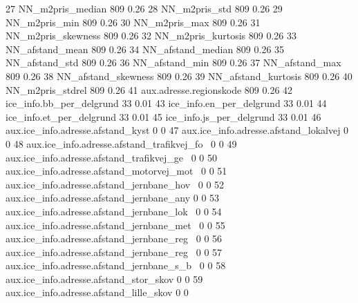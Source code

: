 \documentclass{report}
\begin{document}
\begin{Schunk}
\begin{Soutput}
 27 NN_m2pris_median                                       809              0.26
 28 NN_m2pris_std                                          809              0.26
 29 NN_m2pris_min                                          809              0.26
 30 NN_m2pris_max                                          809              0.26
 31 NN_m2pris_skewness                                     809              0.26
 32 NN_m2pris_kurtosis                                     809              0.26
 33 NN_afstand_mean                                        809              0.26
 34 NN_afstand_median                                      809              0.26
 35 NN_afstand_std                                         809              0.26
 36 NN_afstand_min                                         809              0.26
 37 NN_afstand_max                                         809              0.26
 38 NN_afstand_skewness                                    809              0.26
 39 NN_afstand_kurtosis                                    809              0.26
 40 NN_m2pris_stdrel                                       809              0.26
 41 aux.adresse.regionskode                                809              0.26
 42 ice_info.bb_per_delgrund                                33              0.01
 43 ice_info.en_per_delgrund                                33              0.01
 44 ice_info.et_per_delgrund                                33              0.01
 45 ice_info.js_per_delgrund                                33              0.01
 46 aux.ice_info.adresse.afstand_kyst                        0              0   
 47 aux.ice_info.adresse.afstand_lokalvej                    0              0   
 48 aux.ice_info.adresse.afstand_trafikvej_fo~               0              0   
 49 aux.ice_info.adresse.afstand_trafikvej_ge~               0              0   
 50 aux.ice_info.adresse.afstand_motorvej_mot~               0              0   
 51 aux.ice_info.adresse.afstand_jernbane_hov~               0              0   
 52 aux.ice_info.adresse.afstand_jernbane_any                0              0   
 53 aux.ice_info.adresse.afstand_jernbane_lok~               0              0   
 54 aux.ice_info.adresse.afstand_jernbane_met~               0              0   
 55 aux.ice_info.adresse.afstand_jernbane_reg~               0              0   
 56 aux.ice_info.adresse.afstand_jernbane_reg~               0              0   
 57 aux.ice_info.adresse.afstand_jernbane_s_b~               0              0   
 58 aux.ice_info.adresse.afstand_stor_skov                   0              0   
 59 aux.ice_info.adresse.afstand_lille_skov                  0              0   

\end{Soutput}
\end{Schunk}
\end{document}
